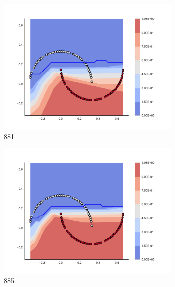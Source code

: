\begin{figure}[h]
\begin{subfigure}[b]{0.09\textwidth}
    \includegraphics[clip, trim=2.35cm 1.75cm 4.5cm 0cm,width=\textwidth]{img/convergence/881.pdf}
    \caption{881}
    \label{fig:convergence_881}
\end{subfigure}
%
\begin{subfigure}[b]{0.09\textwidth}
    \includegraphics[clip, trim=2.35cm 1.75cm 4.5cm 0cm,width=\textwidth]{img/convergence/885.pdf}
    \caption{885}
    \label{fig:convergence_885}
\end{subfigure}
%
\begin{subfigure}[b]{0.09\textwidth}

\end{subfigure}
\end{figure}
